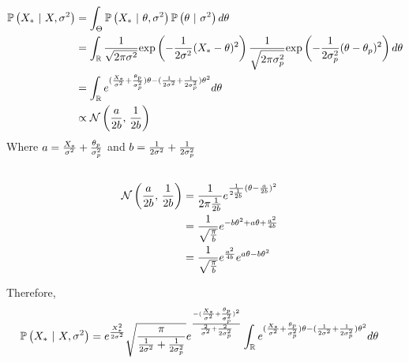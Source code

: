 \documentclass[12pt]{article}
\begin{document}
\begin{enumerate}


\begin{align*}
    \mathbb{P}\left(X_*~|~X, \sigma^2\right) 
        &=\int_\Theta \mathbb{P}\left(X_*~|~\theta, \sigma^2\right) \mathbb{P}\left(\theta~|~\sigma^2\right) d\theta \\
        &=\int_\mathbb{R} \frac{1}{\sqrt{2\pi\sigma^2}}\mathrm{exp}\left(-\frac{1}{2\sigma^2}(X_* - \theta)^2\right) \frac{1}{\sqrt{2\pi\sigma^2_p}}\mathrm{exp}\left(-\frac{1}{2\sigma^2_p}(\theta - \theta_p)^2\right) d\theta \\
        &=\int_\mathbb{R} e^{(\frac{ X_*}{\sigma^2}  + \frac{\theta_p}{\sigma^2_p})\theta  - ( \frac{1}{2\sigma^2} + \frac{1}{2\sigma^2_p})\theta^2} d\theta \\
        &\propto \mathcal{N}\left(\frac{a}{2b},\,\frac{1}{2b}\right) \\
    \end{align*}
    Where $a = \frac{X_*}{\sigma^2} + \frac{\theta_p}{\sigma^2_p}$ and $b = \frac{1}{2\sigma^2} + \frac{1}{2\sigma^2_p}$
    \begin{align*} 
        \\
        \mathcal{N}\left(\frac{a}{2b},\,\frac{1}{2b}\right)  &= \frac{1}{2\pi\frac{1}{2b}} e^{\frac{1}{2\frac{1}{2b}}(\theta - \frac{a}{2b})^2 } \\
        &= \frac{1}{\sqrt{\frac{\pi}{b}}} e^{-b\theta^2 + a\theta + \frac{a^2}{4b}} \\
        &= \frac{1}{\sqrt{\frac{\pi}{b}}} e^{\frac{a^2}{4b}}e^{a\theta - b\theta^2 }
\end{align*}

Therefore, 
\begin{align*}
    \mathbb{P}\left(X_*~|~X, \sigma^2\right) 
        &=e^{\frac{X_*^2}{2\sigma^2}}\sqrt{\frac{\pi}{\frac{1}{2\sigma^2} + \frac{1}{2\sigma^2_p}}} 
        e^{\frac{-(\frac{ X_*}{\sigma^2}  + \frac{\theta_p}{\sigma^2_p})^2}{\frac{2}{\sigma^2} + \frac{2}{2\sigma^2_p}}}
        \int_\mathbb{R} e^{(\frac{ X_*}{\sigma^2}  + \frac{\theta_p}{\sigma^2_p})\theta  - ( \frac{1}{2\sigma^2} + \frac{1}{2\sigma^2_p})\theta^2} d\theta
\end{align*}




\end{enumerate}
\end{document}
